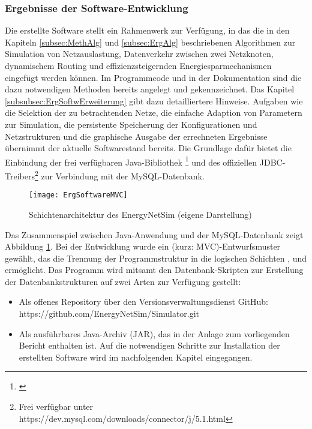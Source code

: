 \subsubsection{Ergebnisse der Software-Entwicklung}
Die erstellte Software  stellt ein Rahmenwerk zur Verfügung, in das die in den Kapiteln
\ref{subsec:MethAlg} und \ref{subsec:ErgAlg} beschriebenen Algorithmen zur Simulation von Netzauslastung, Datenverkehr zwischen zwei Netzknoten, dynamischem Routing und effizienzsteigernden Energiesparmechanismen eingefügt werden können. Im Programmcode und in der Dokumentation sind die dazu notwendigen Methoden bereits angelegt und gekennzeichnet. Das Kapitel \ref{subsubsec:ErgSoftwErweiterung} gibt dazu detailliertere Hinweise.
Aufgaben wie die Selektion der zu betrachtenden Netze, die einfache Adaption von Parametern zur Simulation, die persistente Speicherung der Konfigurationen und Netzstrukturen und die graphische Ausgabe der errechneten Ergebnisse übernimmt der aktuelle Softwarestand bereits. Die Grundlage dafür bietet die Einbindung der frei verfügbaren Java-Bibliothek \footnote{ \cite{jdbc}} und des offiziellen JDBC-Treibers\footnote{Frei verfügbar unter https://dev.mysql.com/downloads/connector/j/5.1.html} zur Verbindung mit der MySQL-Datenbank.
\begin{figure}[ht]
	\centering
	\texttt{[image: ErgSoftwareMVC]}
	\caption{Schichtenarchitektur des EnergyNetSim (eigene Darstellung)}
	\label{fig:ErgSoftwareMVC}
\end{figure}
Das Zusammenspiel zwischen Java-Anwendung und der MySQL-Datenbank zeigt
Abbildung \ref{fig:ErgSoftwareMVC}. Bei der Entwicklung wurde ein  (kurz: MVC)-Entwurfsmuster gewählt, das die Trennung der Programmstruktur in die logischen Schichten ,  und  ermöglicht.
Das Programm wird mitsamt den Datenbank-Skripten zur Erstellung der Datenbankstrukturen auf zwei Arten zur Verfügung gestellt:
\begin{itemize}
\item Als offenes Repository  über den Versionsverwaltungsdienst GitHub: https://github.com/EnergyNetSim/Simulator.git
\item Als ausführbares Java-Archiv (JAR), das in der Anlage zum vorliegenden Bericht enthalten ist.
Auf die notwendigen Schritte zur Installation der erstellten Software wird im nachfolgenden Kapitel eingegangen.
\end{itemize}

